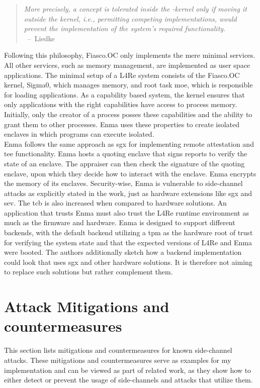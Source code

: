 \begin{quote}
  \textit{ More precisely, a concept is tolerated inside the \mu-kernel only
    if moving it outside the kernel, i.e., permitting competing
    implementations, would prevent the implementation of the system's
    required functionality. \\
  } \mbox{ -- Liedke~\cite{liedtke1995micro}}
\end{quote}

Following this philosophy, Fiasco.OC only implements the mere minimal services.
All other services, such as memory management, are implemented as user space
applications. The minimal setup of a L4Re system consists of the Fiasco.OC
kernel, Sigma0, which manages memory, and root task moe, which is responsible
for loading applications. As a capability based system, the kernel ensures that
only applications with the right capabilities have access to process memory.
Initially, only the creator of a process posses these capabilities and the
ability to grant them to other processes. Enma uses these properties to create
isolated enclaves in which programs can execute isolated.\\

Enma follows the same approach as \gls{sgx} for implementing remote attestation
and \gls{tee} functionality. Enma hosts a quoting enclave that signs reports to
verify the state of an enclave. The appraiser can then check the signature of
the quoting enclave, upon which they decide how to interact with the enclave.
Enma encrypts the memory of its enclaves. Security-wise, Enma is vulnerable to
side-channel attacks as explicitly stated in the work, just as hardware
extensions like \gls{sgx} and \gls{sev}. The \gls{tcb} is also increased when
compared to hardware solutions. An application that trusts Enma must also trust
the L4Re runtime environment as much as the firmware and hardware. Enma is
designed to support different backends, with the default backend utilizing a
\gls{tpm} as the hardware root of trust for verifying the system state and that
the expected versions of L4Re and Enma were booted. The authors additionally
sketch how a backend implementation could look that uses \gls{sgx} and other
hardware solutions. It is therefore not aiming to replace such solutions but
rather complement them.

\section{Attack Mitigations and countermeasures}
\label{sec:20:mitigations}
This section lists mitigations and countermeasures for known side-channel
attacks. These mitigations and countermeasures serve as examples for my
implementation and can be viewed as part of related work, as they show how to
either detect or prevent the usage of side-channels and attacks that utilize
them.

